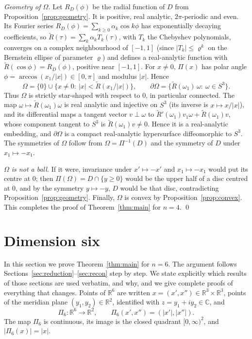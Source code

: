 \documentclass[11pt]{amsart}
\theoremstyle{definition}
\theoremstyle{remark}
\numberwithin{equation}{section}
\newcommand{\R}{\mathbb{R}}
\newcommand{\C}{\mathbb{C}}
\begin{document}
\emph{Geometry of $\Omega$.} Let $R_D(\phi)$ be the radial function of $D$ from Proposition~\ref{prop:geometry}. It is positive, real analytic, $2\pi$-periodic and even. Its Fourier series $R_D(\phi)=\sum_{k\geq0}\alpha_k\cos k\phi$ has exponentially decaying coefficients, so $\widetilde R(\tau)=\sum_k\alpha_kT_k(\tau)$, with $T_k$ the Chebyshev polynomials, converges on a complex neighbourhood of $[-1,1]$ (since $|T_k|\leq\varrho^k$ on the Bernstein ellipse of parameter $\varrho$) and defines a real-analytic function with $\widetilde R(\cos\phi)=R_D(\phi)$, positive near $[-1,1]$. For $x\neq0$, $\Pi(x)$ has polar angle $\phi=\arccos(x_1/|x|)\in[0,\pi]$ and modulus $|x|$. Hence
\[
\Omega=\{0\}\cup\{x\neq0:\ |x|<\widetilde R(x_1/|x|)\},\qquad\partial\Omega=\{\widetilde R(\omega_1)\,\omega:\ \omega\in S^3\}.
\]
Thus $\Omega$ is strictly star-shaped with respect to $0$, in particular connected. The map $\omega\mapsto\widetilde R(\omega_1)\omega$ is real analytic and injective on $S^3$ (its inverse is $x\mapsto x/|x|$), and its differential maps a tangent vector $v\perp\omega$ to $\widetilde R'(\omega_1)v_1\omega+\widetilde R(\omega_1)v$, whose component tangent to $S^3$ is $\widetilde R(\omega_1)v\neq0$. Hence it is a real-analytic embedding, and $\partial\Omega$ is a compact real-analytic hypersurface diffeomorphic to $S^3$. The symmetries of $\Omega$ follow from $\Omega=\Pi^{-1}(D)$ and the symmetry of $D$ under $x_1\mapsto-x_1$.

\emph{$\Omega$ is not a ball.} If it were, invariance under $x'\mapsto-x'$ and $x_1\mapsto-x_1$ would put its centre at $0$; then $\Pi(\Omega)=D\cap\{y\geq0\}$ would be the upper half of a disc centred at $0$, and by the symmetry $y\mapsto-y$, $D$ would be that disc, contradicting Proposition~\ref{prop:geometry}. Finally, $\Omega$ is convex by Proposition~\ref{prop:convex}. This completes the proof of Theorem~\ref{thm:main} for $n=4$. \qed

\section{Dimension six}\label{sec:r6}

In this section we prove Theorem~\ref{thm:main} for $n=6$. The argument follows Sections~\ref{sec:reduction}--\ref{sec:recon} step by step. We state explicitly which results of those sections are used verbatim, and why, and we give complete proofs of everything that changes. Points of $\R^6$ are written $x=(x',x'')\in\R^3\times\R^3$, points of the meridian plane $(y_1,y_2)\in\R^2$, identified with $z=y_1+iy_2\in\C$, and
\[
\Pi_6\colon\R^6\to\R^2,\qquad\Pi_6(x',x'')=(|x'|,|x''|).
\]
The map $\Pi_6$ is continuous, its image is the closed quadrant $[0,\infty)^2$, and $|\Pi_6(x)|=|x|$.
\end{document}
